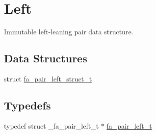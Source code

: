 \hypertarget{group___fa_pair_left}{\section{Left}
\label{group___fa_pair_left}
}


Immutable left-\/leaning pair data structure.  


\subsection*{Data Structures}
\begin{DoxyCompactItemize}
\item 
struct \hyperlink{structfa__pair__left__struct__t}{fa\-\_\-pair\-\_\-left\-\_\-struct\-\_\-t}
\end{DoxyCompactItemize}
\subsection*{Typedefs}
\begin{DoxyCompactItemize}
\item 
typedef struct \-\_\-fa\-\_\-pair\-\_\-left\-\_\-t $\ast$ \hyperlink{group___fa_pair_left_ga3d01023403cd976e31ce70c510fcf2be}{fa\-\_\-pair\-\_\-left\-\_\-t}
\end{DoxyCompactItemize}
